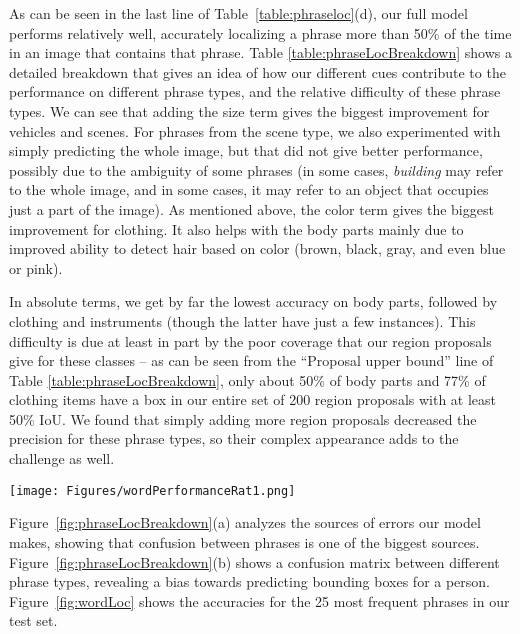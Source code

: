 \documentclass[twocolumn]{svjour3}
\begin{document}
As can be seen in the last line of Table~\ref{table:phraseloc}(d), our full model performs relatively well, accurately localizing a phrase more than 50\% of the time in an image that contains that phrase. Table \ref{table:phraseLocBreakdown} shows a detailed breakdown that gives an idea of how our different cues contribute to the performance on different phrase types, and the relative difficulty of these phrase types. We can see that adding the size term gives the biggest improvement for vehicles and scenes. For phrases from the scene type, we also experimented with simply predicting the whole image, but that did not give better performance, possibly due to the ambiguity of some phrases (in some cases, {\em building} may refer to the whole image, and in some cases, it may refer to an object that occupies just a part of the image). As mentioned above, the color term gives the biggest improvement for clothing. It also helps with the body parts mainly due to improved ability to detect hair based on color (brown, black, gray, and even blue or pink).

In absolute terms, we get by far the lowest accuracy on body parts, followed by clothing and instruments (though the latter have just a few instances). This difficulty is due at least in part by the poor coverage that our region proposals give for these classes -- as can be seen from the ``Proposal upper bound'' line of Table \ref{table:phraseLocBreakdown}, only about 50\% of body parts and 77\% of clothing items have a box in our entire set of 200 region proposals with at least 50\% IoU. We found that simply adding more region proposals decreased the precision for these phrase types, so their complex appearance adds to the challenge as well. 


\begin{figure*}
\centering
\texttt{[image: Figures/wordPerformanceRat1.png]}
\caption{Localization performance of 25 of the most common phrases in the test set using our full model ranking 200 object proposals per image. Darker color indicates phrases that are not from the people type.}
\label{fig:wordLoc}
\end{figure*}



Figure~\ref{fig:phraseLocBreakdown}(a) analyzes the sources of errors our model makes, showing that confusion between phrases is one of the biggest sources. Figure~\ref{fig:phraseLocBreakdown}(b) shows a confusion matrix between different phrase types, revealing a bias towards predicting bounding boxes for a person. Figure~\ref{fig:wordLoc} shows the accuracies for the 25 most frequent phrases in our test set.
\end{document}
